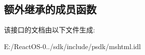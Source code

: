 \subsection*{额外继承的成员函数}


该接口的文档由以下文件生成\+:\begin{DoxyCompactItemize}
\item 
E\+:/\+React\+O\+S-\/0../sdk/include/psdk/mshtml.\+idl\end{DoxyCompactItemize}
